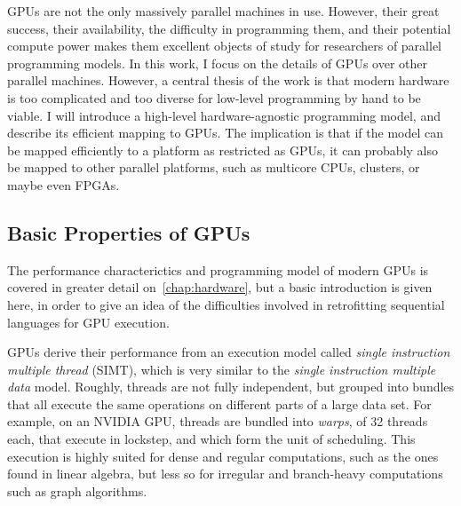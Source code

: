 GPUs are not the only massively parallel machines in use.  However,
their great success, their availability, the difficulty in programming
them, and their potential compute power makes them excellent objects
of study for researchers of parallel programming models.  In this
work, I focus on the details of GPUs over other parallel machines.
However, a central thesis of the work is that modern hardware is too
complicated and too diverse for low-level programming by hand to be
viable.  I will introduce a high-level hardware-agnostic programming
model, and describe its efficient mapping to GPUs.  The implication is
that if the model can be mapped efficiently to a platform as
restricted as GPUs, it can probably also be mapped to other parallel
platforms, such as multicore CPUs, clusters, or maybe even FPGAs.

\subsection{Basic Properties of GPUs}

The performance characterictics and programming model of modern GPUs
is covered in greater detail on~\ref{chap:hardware}, but a basic
introduction is given here, in order to give an idea of the
difficulties involved in retrofitting sequential languages for GPU
execution.

GPUs derive their performance from an execution model called
\textit{single instruction multiple thread} (SIMT), which is very
similar to the \textit{single instruction multiple data} model.
Roughly, threads are not fully independent, but grouped into bundles
that all execute the same operations on different parts of a large
data set.  For example, on an NVIDIA GPU, threads are bundled into
\textit{warps}, of 32 threads each, that execute in lockstep, and
which form the unit of scheduling.  This execution is highly suited
for dense and regular computations, such as the ones found in linear
algebra, but less so for irregular and branch-heavy computations such
as graph algorithms.

